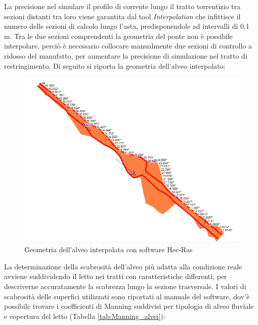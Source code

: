 \documentclass[12pt]{article} %
\begin{document}
%        

\noindent La precisione nel simulare il profilo di corrente lungo il tratto torrentizio tra sezioni distanti tra loro viene garantita dal tool \textit{Interpolation} che infittisce il numero delle sezioni di calcolo lungo l'asta, predisponendole ad intervalli di 0,1 m. Tra le due sezioni comprendenti la geometria del ponte non è possibile interpolare, perciò è necessario collocare manualmente due sezioni di controllo a ridosso del manufatto, per aumentare la precisione di simulazione nel tratto di restringimento.
Di seguito si riporta la geometria dell'alveo interpolato:

\begin{figure}[H]
    \centering
    \includegraphics[scale=0.72]{GeometriaSturla.PNG}
    \caption{Geometria dell'alveo interpolata con software Hec-Ras}
\end{figure}

\noindent La determinazione della scabrosità dell'alveo più adatta alla condizione reale avviene suddividendo il letto nei tratti con caratteristiche differenti, per descriverne accuratamente la scabrezza lungo la sezione trasversale. I valori di scabrosità delle superfici utilizzati sono riportati al manuale del software, dov'è possibile trovare i coefficienti di Manning suddivisi per tipologia di alveo fluviale e copertura del letto (Tabella \ref{tab:Manning_alvei}):
\end{document}
